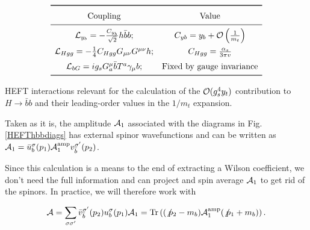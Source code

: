 \begin{table}[!h]
\begin{equation*}
{
  \renewcommand*{\arraystretch}{1.5}
  \begin{array}{cc}
    \toprule
    \text{Coupling} & \text{Value}\\\midrule
     {\cal L}_{y_b} = - \frac{C_{y_b}}{\sqrt{2}}h\bar b b; &C_{yb}=y_b+{\cal O}\left(\frac{1}{m_t}\right)\\
     {\cal L}_{Hgg} = -\frac{1}{4}C_{Hgg} G_{\mu\nu}G^{\mu\nu}h; & C_{Hgg}=\frac{\as}{3\pi v}\\
     {\cal L}_{bG} = i g_s G^\mu_a \bar b T^a\gamma_\mu b ; & \text{Fixed by gauge invariance}\\
    \bottomrule
\end{array}}
\end{equation*}
  \caption[HEFT Lagragian and couplings]{HEFT interactions relevant for the calculation of the ${\cal O}(g_s^4 y_t)$ contribution to $H\to \bar b b$ and their leading-order values in the $1/m_t$ expansion.}
  \label{HEFTcoupligs}
\end{table}

Taken as it is, the amplitude ${\cal A}_1$ associated with the diagrams in Fig. \ref{HEFThbbdiags} has external spinor wavefunctions and can be written as ${\cal A}_1 = \bar u_b^\sigma(p_1) {\cal A}_1^\text{amp} v_{\bar b}^{\sigma'}(p_2)$.

Since this calculation is a means to the end of extracting a Wilson coefficient, we don't need the full information and can project and spin average ${\cal A}_1$ to get rid of the spinors. In practice, we will therefore work with

\begin{equation}
  {\cal A} = \sum_{\sigma\sigma'} \bar v_{\bar b}^{\sigma'}(p_2) u_b^\sigma(p_1) {\cal A}_1
  =\text{Tr}\left((\not p_2-m_b){\cal A}_1^\text{amp}(\not p_1+m_b)\right).
\end{equation}
